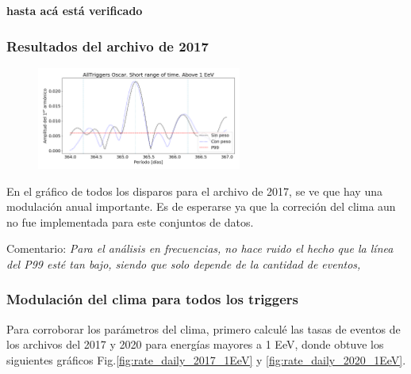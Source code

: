 {\bf hasta acá está verificado}
			\subsubsection{Resultados del archivo de 2017}

				\begin{figure}[H]
					\centering
					\includegraphics[width=0.6\textwidth]{AllTriggers/AllTriggers_2017_Short_range_Above_1_EeV.png}
				\end{figure}
			En el gráfico de todos los disparos para el archivo de 2017, se ve que hay una modulación anual importante. Es de esperarse ya que la correción del clima aun no fue implementada para este conjuntos de datos.

			Comentario: {\sl Para el análisis en frecuencias, no hace ruido el hecho que la línea del P99 esté tan bajo, siendo que solo depende de la cantidad de eventos, }





			\subsubsection{Modulación del clima para todos los triggers}




			Para corroborar los parámetros del clima, primero calculé las tasas de eventos de los archivos del 2017 y 2020 para energías mayores a 1  EeV, donde obtuve los siguientes gráficos Fig.\ref{fig:rate_daily_2017_1EeV} y \ref{fig:rate_daily_2020_1EeV}. 

